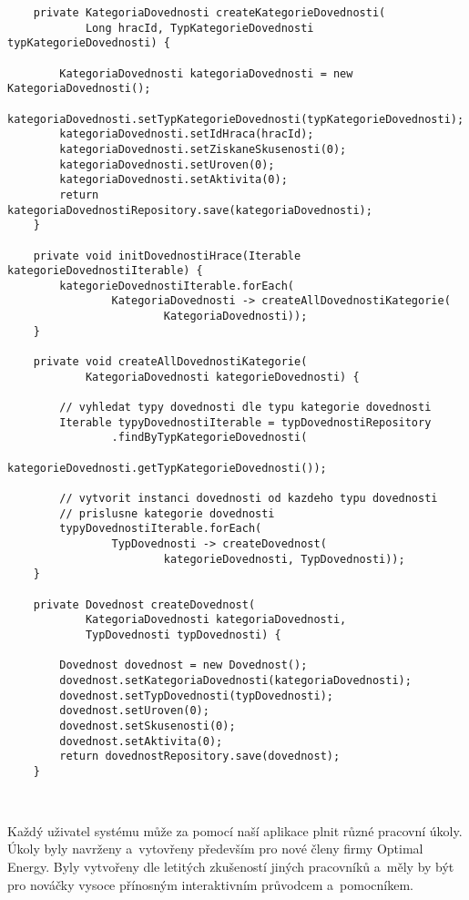 \documentclass[12pt]{article}
\begin{document}
{\begin{lstlisting}
    private KategoriaDovednosti createKategorieDovednosti(
            Long hracId, TypKategorieDovednosti typKategorieDovednosti) {

        KategoriaDovednosti kategoriaDovednosti = new KategoriaDovednosti();
        kategoriaDovednosti.setTypKategorieDovednosti(typKategorieDovednosti);
        kategoriaDovednosti.setIdHraca(hracId);
        kategoriaDovednosti.setZiskaneSkusenosti(0);
        kategoriaDovednosti.setUroven(0);
        kategoriaDovednosti.setAktivita(0);
        return kategoriaDovednostiRepository.save(kategoriaDovednosti);
    }
    
    private void initDovednostiHrace(Iterable kategorieDovednostiIterable) {
        kategorieDovednostiIterable.forEach(
                KategoriaDovednosti -> createAllDovednostiKategorie(
                        KategoriaDovednosti));
    }

    private void createAllDovednostiKategorie(
            KategoriaDovednosti kategorieDovednosti) {

        // vyhledat typy dovednosti dle typu kategorie dovednosti
        Iterable typyDovednostiIterable = typDovednostiRepository
                .findByTypKategorieDovednosti(
                        kategorieDovednosti.getTypKategorieDovednosti());

        // vytvorit instanci dovednosti od kazdeho typu dovednosti
        // prislusne kategorie dovednosti
        typyDovednostiIterable.forEach(
                TypDovednosti -> createDovednost(
                        kategorieDovednosti, TypDovednosti));
    }
    
    private Dovednost createDovednost(
            KategoriaDovednosti kategoriaDovednosti,
            TypDovednosti typDovednosti) {

        Dovednost dovednost = new Dovednost();
        dovednost.setKategoriaDovednosti(kategoriaDovednosti);
        dovednost.setTypDovednosti(typDovednosti);
        dovednost.setUroven(0);
        dovednost.setSkusenosti(0);
        dovednost.setAktivita(0);
        return dovednostRepository.save(dovednost);
    }

    
\end{lstlisting}

\clearpage


Každý uživatel systému může za pomocí naší aplikace plnit různé pracovní úkoly.
Úkoly byly navrženy a~vytovřeny především pro nové členy firmy Optimal Energy. 
Byly vytvořeny dle letitých zkušeností jiných pracovníků 
a~měly by být pro nováčky vysoce přínosným interaktivním průvodcem a~pomocníkem.

}
\end{document}
